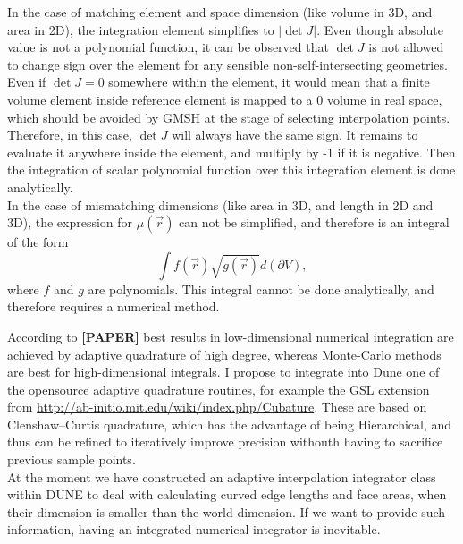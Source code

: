 \noindent
In the case of matching element and space dimension (like volume in 3D, and area in 2D), the integration element simplifies to $|\det J|$. Even though absolute value is not a polynomial function, it can be observed that $\det J$ is not allowed to change sign over the element for any sensible non-self-intersecting geometries. Even if $\det J = 0$ somewhere within the element, it would mean that a finite volume element inside reference element is mapped to a 0 volume in real space, which should be avoided by GMSH at the stage of selecting interpolation points. Therefore, in this case, $\det J$ will always have the same sign. It remains to evaluate it anywhere inside the element, and multiply by -1 if it is negative. Then the integration of scalar polynomial function over this integration element is done analytically. \\

\noindent
In the case of mismatching dimensions (like area in 3D, and length in 2D and 3D), the expression for $\mu(\vec{r})$ can not be simplified, and therefore is an integral of the form \[\int f(\vec{r}) \sqrt{g(\vec{r})} d(\partial V),\] where $f$ and $g$ are polynomials. This integral cannot be done analytically, and therefore requires a numerical method.

\noindent
According to \textbf{[PAPER]} best results in low-dimensional numerical integration are achieved by adaptive quadrature of high degree, whereas Monte-Carlo methods are best for high-dimensional integrals. I propose to integrate into Dune one of the opensource adaptive quadrature routines, for example the GSL extension from \url{http://ab-initio.mit.edu/wiki/index.php/Cubature}. These are based on Clenshaw–Curtis quadrature, which has the advantage of being Hierarchical, and thus can be refined to iteratively improve precision withouth having to sacrifice previous sample points. \\

\noindent
At the moment we have constructed an adaptive interpolation integrator class within DUNE to deal with calculating curved edge lengths and face areas, when their dimension is smaller than the world dimension. If we want to provide such information, having an integrated numerical integrator is inevitable.